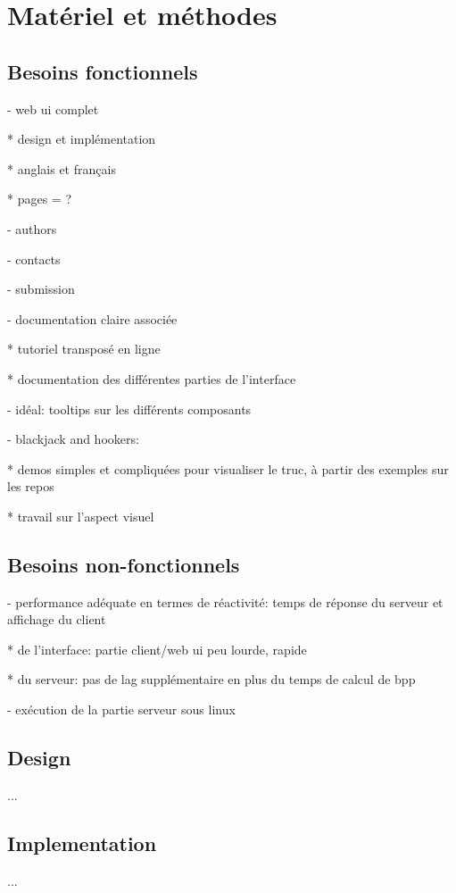 \section{Matériel et méthodes}

\subsection{Besoins fonctionnels}

- web ui complet

	* design et implémentation

	* anglais et français

	* pages = ?

		- authors

		- contacts

		- submission

- documentation claire associée

	* tutoriel transposé en ligne

	* documentation des différentes parties de l'interface

		- idéal: tooltips sur les différents composants

- blackjack and hookers:

	* demos simples et compliquées pour visualiser le truc, à partir des exemples sur les repos

	* travail sur l'aspect visuel

\subsection{Besoins non-fonctionnels}

- performance adéquate en termes de réactivité: temps de réponse du serveur et affichage du client

	* de l'interface: partie client/web ui peu lourde, rapide

	* du serveur: pas de lag supplémentaire en plus du temps de calcul de bpp

- exécution de la partie serveur sous linux

\subsection{Design}

...

\subsection{Implementation}

...
